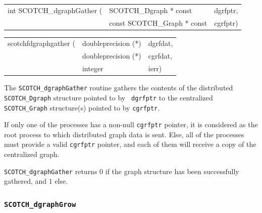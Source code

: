\begin{itemize}
\progsyn

{\tt\begin{tabular}{l@{}ll}
int SCOTCH\_dgraphGather ( & SCOTCH\_Dgraph * const      & dgrfptr, \\
                           & const SCOTCH\_Graph * const & cgrfptr)
\end{tabular}}

{\tt\begin{tabular}{l@{}ll}
scotchfdgraphgather ( & doubleprecision (*) & dgrfdat, \\
                      & doubleprecision (*) & cgrfdat, \\
                      & integer             & ierr)
\end{tabular}}

\progdes

The {\tt SCOTCH\_dgraphGather} routine gathers the contents of the
distributed {\tt SCOTCH\_\lbt Dgraph} structure pointed to by {\tt
dgrfptr} to the centralized {\tt SCOTCH\_\lbt Graph} structure(s)
pointed to by {\tt cgrfptr}.

If only one of the processes has a non-null {\tt cgrfptr}
pointer, it is considered as the root process to which distributed
graph data is sent. Else, all of the processes must provide a valid
{\tt cgrfptr} pointer, and each of them will receive a copy of
the centralized graph.

\progret

{\tt SCOTCH\_dgraphGather} returns $0$ if the graph structure has
been successfully gathered, and $1$ else.
\end{itemize}

\subsubsection{{\tt SCOTCH\_dgraphGrow}}
\label{sec-lib-func-dgraphgrow}

